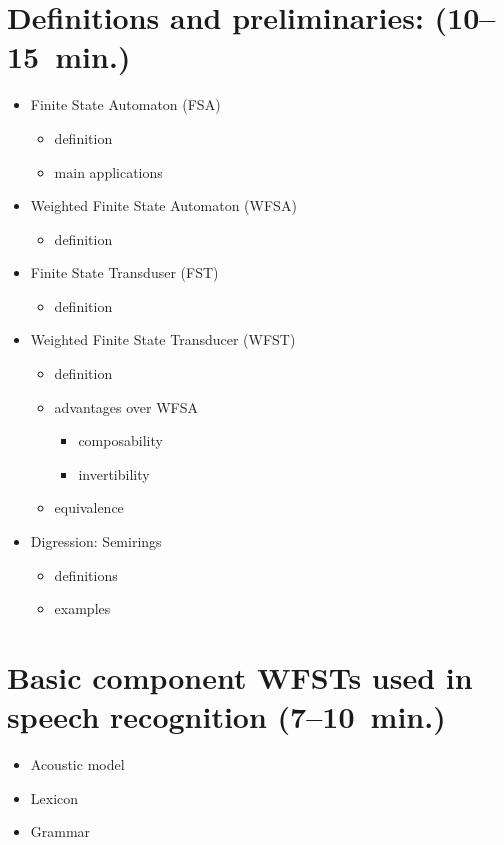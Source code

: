 \documentclass{article}
\begin{document}
\section{Definitions and preliminaries: (10--15~min.)}

\begin{itemize}
\item Finite State Automaton (FSA)
  \begin{itemize}
    \item definition
    \item main applications
  \end{itemize}
\item Weighted Finite State Automaton (WFSA)
  \begin{itemize}
    \item definition
  \end{itemize}
\item Finite State Transduser (FST)
  \begin{itemize}
    \item definition
  \end{itemize}
\item Weighted Finite State Transducer (WFST)
  \begin{itemize}
    \item definition
    \item advantages over WFSA
      \begin{itemize}
        \item composability
        \item invertibility
      \end{itemize}
    \item equivalence
  \end{itemize}
\item Digression: Semirings
  \begin{itemize}
    \item definitions
    \item examples
  \end{itemize}
\end{itemize}

\section{Basic component WFSTs used in speech recognition (7--10~min.)}

\begin{itemize}
  \item Acoustic model
  \item Lexicon
  \item Grammar
\end{itemize}
\end{document}
